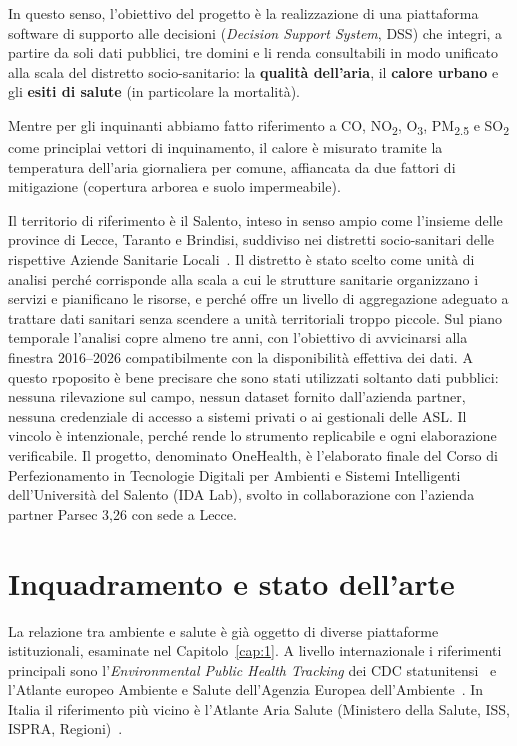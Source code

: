 In questo senso, l'obiettivo del progetto è la realizzazione di una piattaforma software di supporto alle decisioni (\emph{Decision Support System}, DSS) che integri, a partire da soli dati pubblici, tre domini e li renda consultabili in modo unificato alla scala del distretto socio-sanitario: la \textbf{qualità dell'aria}, il \textbf{calore urbano} e gli \textbf{esiti di salute} (in particolare la mortalità). 

Mentre per gli inquinanti abbiamo fatto riferimento a CO, NO\textsubscript{2}, O\textsubscript{3}, PM\textsubscript{2.5} e SO\textsubscript{2} come principlai vettori di inquinamento, il calore è misurato tramite la temperatura dell'aria giornaliera per comune, affiancata da due fattori di mitigazione (copertura arborea e suolo impermeabile).

Il territorio di riferimento è il Salento, inteso in senso ampio come l'insieme delle province di Lecce, Taranto e Brindisi, suddiviso nei distretti socio-sanitari delle rispettive Aziende Sanitarie Locali~\cite{distretti_asl_lecce,distretti_asl_brindisi,distretti_asl_taranto}. Il distretto è stato scelto come unità di analisi perché corrisponde alla scala a cui le strutture sanitarie organizzano i servizi e pianificano le risorse, e perché offre un livello di aggregazione adeguato a trattare dati sanitari senza scendere a unità territoriali troppo piccole. Sul piano temporale l'analisi copre almeno tre anni, con l'obiettivo di avvicinarsi alla finestra 2016--2026 compatibilmente con la disponibilità effettiva dei dati. A questo rpoposito è bene precisare che sono stati utilizzati soltanto dati pubblici: nessuna rilevazione sul campo, nessun dataset fornito dall'azienda partner, nessuna credenziale di accesso a sistemi privati o ai gestionali delle ASL. Il vincolo è intenzionale, perché rende lo strumento replicabile e ogni elaborazione verificabile.
Il progetto, denominato OneHealth, è l'elaborato finale del Corso di Perfezionamento in Tecnologie Digitali per Ambienti e Sistemi Intelligenti dell'Università del Salento (IDA Lab), svolto in collaborazione con l'azienda partner Parsec 3,26 con sede a Lecce.

\section{Inquadramento e stato dell'arte}
\label{sec:intro-stato-arte}

La relazione tra ambiente e salute è già oggetto di diverse piattaforme istituzionali, esaminate nel Capitolo~\ref{cap:1}. A livello internazionale i riferimenti principali sono l'\emph{Environmental Public Health Tracking} dei CDC statunitensi~\cite{cdc_tracking} e l'Atlante europeo Ambiente e Salute dell'Agenzia Europea dell'Ambiente~\cite{eea_atlas}. In Italia il riferimento più vicino è l'Atlante Aria Salute (Ministero della Salute, ISS, ISPRA, Regioni)~\cite{atlante_aria_salute}.

